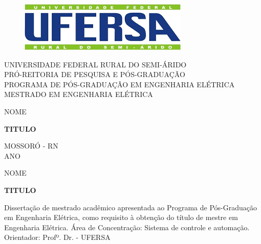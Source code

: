 \normalsize 
\begin{titlepage}
\onehalfspacing 
 \begin{figure}
 \centering
  	\includegraphics[scale=0.37]{figuras/logo-ufersa.png}
 \end{figure}
  

\setlength\parindent{0pt}
\begin{center}

 UNIVERSIDADE FEDERAL RURAL DO SEMI-ÁRIDO \\
 PRÓ-REITORIA DE PESQUISA E PÓS-GRADUAÇÃO \\
PROGRAMA DE PÓS-GRADUAÇÃO EM ENGENHARIA ELÉTRICA \\ 
MESTRADO EM ENGENHARIA ELÉTRICA
\end{center}
\vfill

  
\begin{center}
  {{NOME}}\\[4cm]
\end{center}

\begin{center}
   {{{\textbf{TITULO}}}}\\[4cm]
   \end{center}


  \vfill

\vspace{2cm}
\begin{center}

 {MOSSORÓ - RN}
\\
 {ANO}
\end{center}

\end{titlepage}

\onehalfspacing 
\thispagestyle{empty}
\begin{center}
  {{NOME}}\\[4cm]
\end{center}

\begin{center}
   {{{\textbf{TITULO}}}}\\[4cm]
   \end{center}

   \hspace{.45\textwidth} %
   \begin{minipage}{.5\textwidth}
   \onehalfspacing 
   Dissertação de mestrado acadêmico apresentada ao Programa de Pós-Graduação em Engenharia Elétrica, como requisito
 à obtenção do título de mestre em
Engenharia Elétrica. Área de Concentração:
Sistema de controle e automação.\\[1cm]
Orientador: Profº. Dr.  - UFERSA
  \end{minipage}
  \vfill

